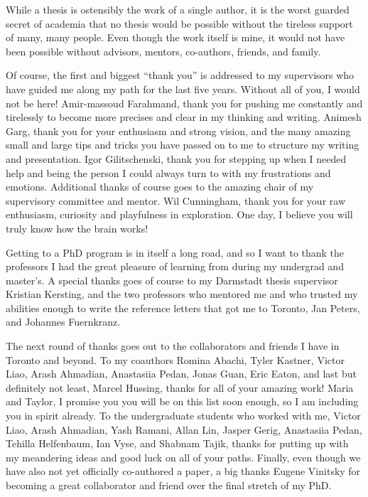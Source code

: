 While a thesis is ostensibly the work of a single author, it is the worst guarded secret of academia that no thesis would be possible without the tireless support of many, many people.
Even though the work itself is mine, it would not have been possible without advisors, mentors, co-authors, friends, and family.

Of course, the first and biggest ``thank you'' is addressed to my supervisors who have guided me along my path for the last five years.
Without all of you, I would not be here!
Amir-massoud Farahmand, thank you for pushing me constantly and tirelessly to become more precises and clear in my thinking and writing.
Animesh Garg, thank you for your enthusiasm and strong vision, and the many amazing small and large tips and tricks you have passed on to me to structure my writing and presentation.
Igor Gilitschenski, thank you for stepping up when I needed help and being the person I could always turn to with my frustrations and emotions.
Additional thanks of course goes to the amazing chair of my supervisory committee and mentor.
Wil Cunningham, thank you for your raw enthusiasm, curiosity and playfulness in exploration.
One day, I believe you will truly know how the brain works!

Getting to a PhD program is in itself a long road, and so I want to thank the professors I had the great pleasure of learning from during my undergrad and master's.
A special thanks goes of course to my Darmstadt thesis supervisor Kristian Kersting, and the two professors who mentored me and who trusted my abilities enough to write the reference letters that got me to Toronto, Jan Peters, and Johannes Fuernkranz.

The next round of thanks goes out to the collaborators and friends I have in Toronto and beyond.
To my coauthors Romina Abachi, Tyler Kastner, Victor Liao, Arash Ahmadian, Anastasiia Pedan, Jonas Guan, Eric Eaton, and last but definitely not least, Marcel Hussing, thanks for all of your amazing work!
Maria and Taylor, I promise you you will be on this list soon enough, so I am including you in spirit already.
To the undergraduate students who worked with me, Victor Liao, Arash Ahmadian, Yash Ramani, Allan Lin, Jasper Gerig, Anastasiia Pedan, Tehilla Helfenbaum, Ian Vyse, and Shabnam Tajik, thanks for putting up with my meandering ideas and good luck on all of your paths.
Finally, even though we have also not yet officially co-authored a paper, a big thanks Eugene Vinitsky for becoming a great collaborator and friend over the final stretch of my PhD.

